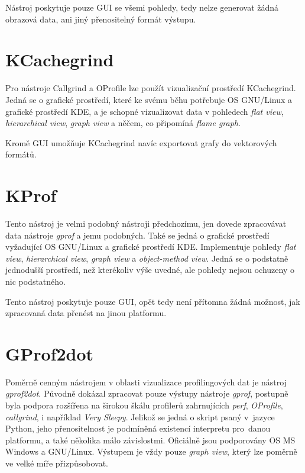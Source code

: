 \documentclass[czech,BP]{thesiskiv}
\begin{document}
Nástroj poskytuje pouze GUI se všemi pohledy, tedy nelze generovat žádná obrazová data, ani jiný přenositelný formát výstupu.

\section{KCachegrind}

Pro nástroje Callgrind a OProfile lze použít vizualizační prostředí KCachegrind. Jedná se o grafické prostředí, které ke svému běhu potřebuje OS GNU/Linux a grafické prostředí KDE, a je schopné vizualizovat data v pohledech \emph{flat view}, \emph{hierarchical view}, \emph{graph view} a něčem, co připomíná \emph{flame graph}.

Kromě GUI umožňuje KCachegrind navíc exportovat grafy do vektorových formátů.

\section{KProf}

Tento nástroj je velmi podobný nástroji předchozímu, jen dovede zpracovávat data nástroje \emph{gprof} a jemu podobných. Také se jedná o grafické prostředí vyžadující OS GNU/Linux a grafické prostředí KDE. Implementuje pohledy \emph{flat view}, \emph{hierarchical view}, \emph{graph view} a \emph{object-method view}. Jedná se o podstatně jednodušší prostředí, než kterékoliv výše uvedné, ale pohledy nejsou ochuzeny o nic podstatného.

Tento nástroj poskytuje pouze GUI, opět tedy není přítomna žádná možnost, jak zpracovaná data přenést na jinou platformu.

\section{GProf2dot}

Poměrně cenným nástrojem v oblasti vizualizace profilingových dat je nástroj \emph{gprof2dot}. Původně dokázal zpracovat pouze výstupy nástroje \emph{gprof}, postupně byla podpora rozšířena na širokou škálu profilerů zahrnujících \emph{perf}, \emph{OProfile}, \emph{callgrind}, i například \emph{Very Sleepy}. Jelikož se jedná o skript psaný v~jazyce Python, jeho přenositelnost je podmíněná existencí interpretu pro~danou platformu, a také několika málo závislostmi. Oficiálně jsou podporovány OS MS Windows a GNU/Linux. Výstupem je vždy pouze \emph{graph view}, který lze poměrně ve velké míře přizpůsobovat.
\end{document}
